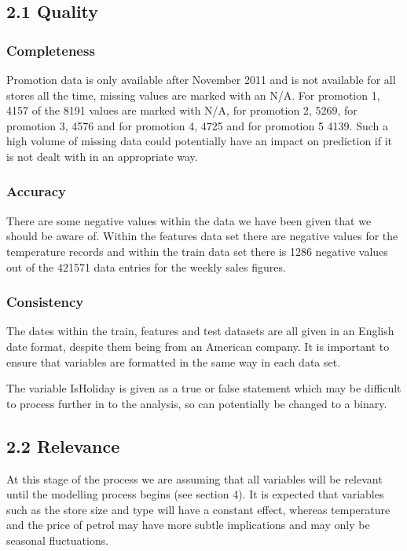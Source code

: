 \documentclass[11pt,]{article}
\begin{document}
\subsection{2.1 Quality}\label{quality}

\subsubsection{Completeness}\label{completeness}

Promotion data is only available after November 2011 and is not
available for all stores all the time, missing values are marked with an
N/A. For promotion 1, 4157 of the 8191 values are marked with N/A, for
promotion 2, 5269, for promotion 3, 4576 and for promotion 4, 4725 and
for promotion 5 4139. Such a high volume of missing data could
potentially have an impact on prediction if it is not dealt with in an
appropriate way.

\subsubsection{Accuracy}\label{accuracy}

There are some negative values within the data we have been given that
we should be aware of. Within the features data set there are negative
values for the temperature records and within the train data set there
is 1286 negative values out of the 421571 data entries for the weekly
sales figures.

\subsubsection{Consistency}\label{consistency}

The dates within the train, features and test datasets are all given in
an English date format, despite them being from an American company. It
is important to ensure that variables are formatted in the same way in
each data set.

The variable IsHoliday is given as a true or false statement which may
be difficult to process further in to the analysis, so can potentially
be changed to a binary.

\subsection{2.2 Relevance}\label{relevance}

At this stage of the process we are assuming that all variables will be
relevant until the modelling process begins (see section 4). It is
expected that variables such as the store size and type will have a
constant effect, whereas temperature and the price of petrol may have
more subtle implications and may only be seasonal fluctuations.
\end{document}
